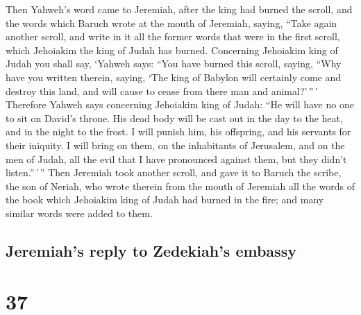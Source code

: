  Then Yahweh's word came to Jeremiah, after the king had
burned the scroll, and the words which Baruch wrote at the mouth of
Jeremiah, saying,  ``Take again another scroll, and write
in it all the former words that were in the first scroll, which
Jehoiakim the king of Judah has burned.  Concerning
Jehoiakim king of Judah you shall say, `Yahweh says: ``You have burned
this scroll, saying, ``Why have you written therein, saying, `The king
of Babylon will certainly come and destroy this land, and will cause to
cease from there man and animal?'\,''\,'  Therefore
Yahweh says concerning Jehoiakim king of Judah: ``He will have no one to
sit on David's throne. His dead body will be cast out in the day to the
heat, and in the night to the frost.  I will punish him,
his offspring, and his servants for their iniquity. I will bring on
them, on the inhabitants of Jerusalem, and on the men of Judah, all the
evil that I have pronounced against them, but they didn't
listen.''\,'\,''  Then Jeremiah took another scroll, and
gave it to Baruch the scribe, the son of Neriah, who wrote therein from
the mouth of Jeremiah all the words of the book which Jehoiakim king of
Judah had burned in the fire; and many similar words were added to them.

\hypertarget{jeremiahs-reply-to-zedekiahs-embassy}{%
\subsection{Jeremiah's reply to Zedekiah's
embassy}\label{jeremiahs-reply-to-zedekiahs-embassy}}

\hypertarget{section-36}{%
\section{37}\label{section-36}}

